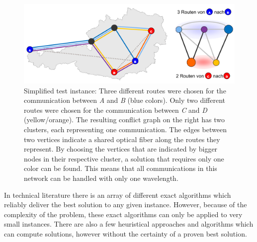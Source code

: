 \documentclass[paper=a4,fontsize=12pt]{scrartcl}
\begin{document}
\begin{figure}
    \includegraphics[width=1.0\textwidth]{../img/translation.pdf}
    \caption[Simplified test instance]{Simplified test instance: Three different routes were chosen for the communication between \emph{A} and \emph{B} (blue colors). Only two different routes were chosen for the communication between \emph{C} and \emph{D} (yellow/orange). The resulting conflict graph on the right has two clusters, each representing one communication. The edges between two vertices indicate a shared optical fiber along the routes they represent. By choosing the vertices that are indicated by bigger nodes in their respective cluster, a solution that requires only one color can be found. This means that all communications in this network can be handled with only one wavelength.}
    \label{fig:translation}
\end{figure}

In technical literature there is an array of different exact algorithms which reliably deliver the best solution to any given instance. However, because of the complexity of the problem, these exact algorithms can only be applied to very small instances. There are also a few heuristical approaches and algorithms which can compute solutions, however without the certainty of a proven best solution.

\end{document}
